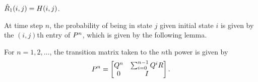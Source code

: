\begin{mycor}
	\label{cor:hatR1}
	$\hat{R}_{1}(i, j) = H(i, j)$.
\end{mycor}

At time step $n$, the probability of being in state $j$ given initial state $i$ is given by the $(i, j)$th entry of $P^n$, which is given by the following lemma.

\begin{myLemma}
	\label{lem:transM_n}
	For $n = 1, 2, \ldots $, the transition matrix taken to the $n$th power is given by 
	\begin{equation}
	\label{eq:transM_n}
		P^n = 
			\begin{bmatrix}
				Q^n & \sum_{i = 0}^{n-1} Q^{i}R \\ 
				0 & I
			\end{bmatrix}.
	\end{equation}
\end{myLemma}

